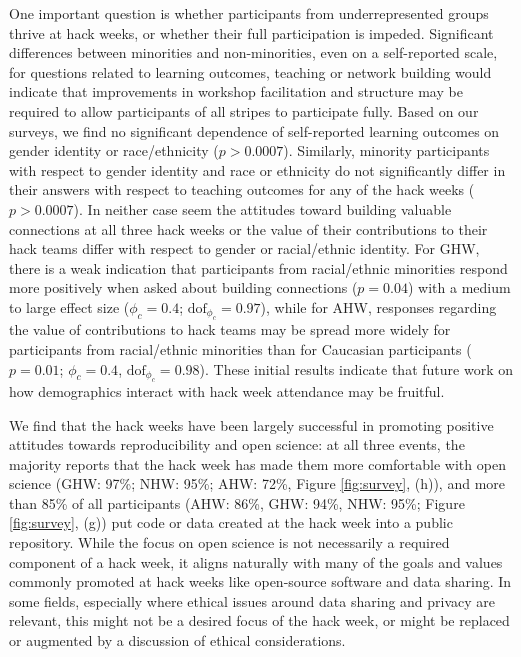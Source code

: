 One important question is whether participants from underrepresented groups thrive at hack weeks, or whether their full participation is impeded. Significant differences between minorities and non-minorities, even on a self-reported scale, for questions related to learning outcomes, teaching or network building would indicate that improvements in workshop facilitation and structure may be required to allow participants of all stripes to participate fully.
Based on our surveys, we find no significant dependence of self-reported learning outcomes on gender identity or race/ethnicity ($p > 0.0007$). Similarly, minority participants with respect to gender identity and race or ethnicity do not significantly differ in their answers with respect to teaching outcomes for any of the hack weeks ($p > 0.0007$). In neither case seem the attitudes toward building valuable connections at all three hack weeks or the value of their contributions to their hack teams differ with respect to gender or racial/ethnic identity. For GHW, there is a weak indication that participants from racial/ethnic minorities respond more positively when asked about building connections ($p=0.04$) with a medium to large effect size ($\phi_c = 0.4$; $\mathrm{dof}_{\phi_c} = 0.97$), while for AHW, responses regarding the value of contributions to hack teams may be spread more widely for participants from racial/ethnic minorities than for Caucasian participants ($p = 0.01$; $\phi_c = 0.4$, $\mathrm{dof}_{\phi_c} = 0.98$). These initial results indicate that future work on how demographics interact with hack week attendance may be fruitful.

We find that the hack weeks have been largely successful in promoting positive attitudes towards reproducibility and open science: at all three events, the majority reports that the hack week has made them more comfortable with open science  (GHW: 97\%; NHW: 95\%; AHW: 72\%, Figure \ref{fig:survey}, (h)), and more than 85\% of all participants (AHW: 86\%, GHW: 94\%, NHW: 95\%; Figure \ref{fig:survey}, (g)) put code or data created at the hack week into a public repository.
While the focus on open science is not necessarily a required component of a hack week, it aligns naturally with many of the goals and values commonly promoted at hack weeks like open-source software and data sharing. In some fields, especially where ethical issues around data sharing and privacy are relevant, this might not be a desired focus of the hack week, or might be replaced or augmented by a discussion of ethical considerations.

